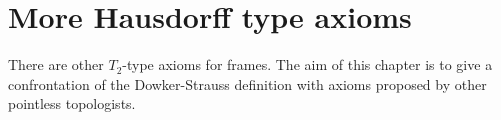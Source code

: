 \chapter{More Hausdorff type axioms}

There are other $T_2$-type axioms for frames.
The aim of this chapter is to give a confrontation of the Dowker-Strauss
definition with axioms proposed by other pointless topologists.

